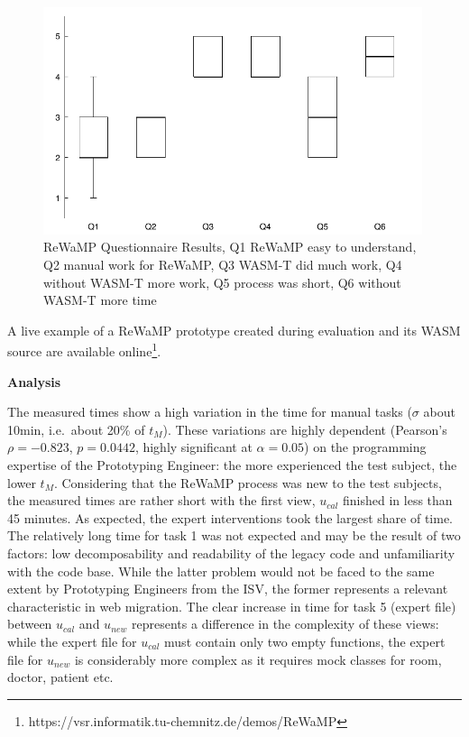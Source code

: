\begin{figure}
\hypertarget{fig:rewamp.boxplot}{%
\centering
\includegraphics[width=0.99\textwidth]{../figures/boxplots/rewamp-boxplot.pdf}
\caption{ReWaMP Questionnaire Results, Q1 ReWaMP easy to understand, Q2 manual work for ReWaMP, Q3 WASM-T did much work, Q4 without WASM-T more work, Q5 process was short, Q6 without WASM-T more time}\label{fig:rewamp.boxplot}
}
\end{figure}

A live example of a ReWaMP prototype created during evaluation and its WASM source are available online\footnote{https://vsr.informatik.tu-chemnitz.de/demos/ReWaMP}.

\textbf{Analysis}

The measured times show a high variation in the time for manual tasks (\(\sigma\) about 10min, i.e.~about 20\% of \(t_M\)).
These variations are highly dependent (Pearson's \(\rho=-0.823\), \(p=0.0442\), highly significant at \(\alpha = 0.05\)) on the programming expertise of the Prototyping Engineer: the more experienced the test subject, the lower \(t_M\).
Considering that the ReWaMP process was new to the test subjects, the measured times are rather short with the first view, \(u_{cal}\) finished in less than 45 minutes.
As expected, the expert interventions took the largest share of time.
The relatively long time for task 1 was not expected and may be the result of two factors: low decomposability and readability of the legacy code and unfamiliarity with the code base.
While the latter problem would not be faced to the same extent by Prototyping Engineers from the ISV, the former represents a relevant characteristic in web migration.
The clear increase in time for task 5 (expert file) between \(u_{cal}\) and \(u_{new}\) represents a difference in the complexity of these views: while the expert file for \(u_{cal}\) must contain only two empty functions, the expert file for \(u_{new}\) is considerably more complex as it requires mock classes for room, doctor, patient etc.

